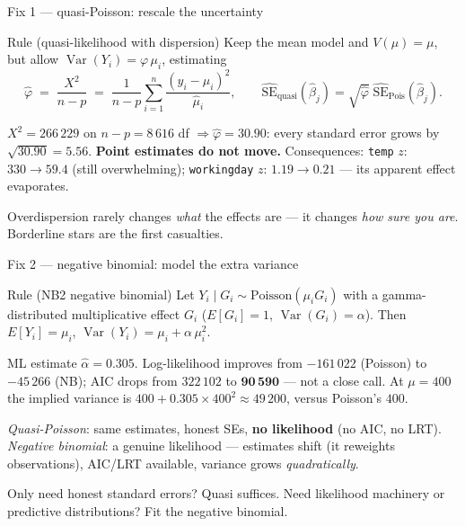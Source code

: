 \documentclass[aspectratio=169,11pt]{beamer}
\begin{document}
\begin{frame}{Fix 1 --- quasi-Poisson: rescale the uncertainty}
  \begin{block}{Rule (quasi-likelihood with dispersion)}
    Keep the mean model and $V(\mu)=\mu$, but allow
    $\operatorname{Var}(Y_i) = \varphi\,\mu_i$, estimating
    \[
      \hat\varphi \;=\; \frac{X^2}{n-p} \;=\; \frac{1}{n-p}\sum_{i=1}^{n}\frac{(y_i-\hat\mu_i)^2}{\hat\mu_i},
      \qquad
      \widehat{\text{SE}}_{\text{quasi}}(\hat\beta_j) = \sqrt{\hat\varphi}\;\widehat{\text{SE}}_{\text{Pois}}(\hat\beta_j).
    \]
  \end{block}
  \begin{numexample}
    $X^2 = 266\,229$ on $n-p = 8\,616$ df $\Rightarrow \hat\varphi = \mathbf{30.90}$:
    every standard error grows by $\sqrt{30.90} = \mathbf{5.56}$.
    \textbf{Point estimates do not move.} Consequences:
    \texttt{temp} $z$: $330 \to 59.4$ (still overwhelming);
    \texttt{workingday} $z$: $1.19 \to \mathbf{0.21}$ --- its apparent effect
    evaporates.
  \end{numexample}
  \begin{takeaway}
    Overdispersion rarely changes \emph{what} the effects are --- it changes
    \emph{how sure you are}. Borderline stars are the first casualties.
  \end{takeaway}
\end{frame}

\begin{frame}{Fix 2 --- negative binomial: model the extra variance}
  \footnotesize
  \begin{block}{Rule (NB2 negative binomial)}
    \footnotesize
    Let $Y_i \mid G_i \sim \text{Poisson}(\mu_i G_i)$ with a gamma-distributed
    multiplicative effect $G_i$ ($E[G_i]=1$, $\operatorname{Var}(G_i)=\alpha$). Then
    \;$E[Y_i] = \mu_i$, \quad $\operatorname{Var}(Y_i) = \mu_i + \alpha\,\mu_i^2$.
  \end{block}
  \begin{numexample}
    ML estimate $\hat\alpha = \mathbf{0.305}$. Log-likelihood improves from
    $-161\,022$ (Poisson) to $-45\,266$ (NB); AIC drops from $322\,102$ to
    $\mathbf{90\,590}$ --- not a close call. At $\mu = 400$ the implied variance is
    $400 + 0.305\times 400^2 \approx 49\,200$, versus Poisson's $400$.
  \end{numexample}
  \begin{readme}
    \emph{Quasi-Poisson}: same estimates, honest SEs, \textbf{no likelihood} (no AIC,
    no LRT). \emph{Negative binomial}: a genuine likelihood --- estimates shift (it
    reweights observations), AIC/LRT available, variance grows \emph{quadratically}.
  \end{readme}
  \begin{takeaway}
    Only need honest standard errors? Quasi suffices. Need likelihood machinery or
    predictive distributions? Fit the negative binomial.
  \end{takeaway}
\end{frame}
\end{document}
